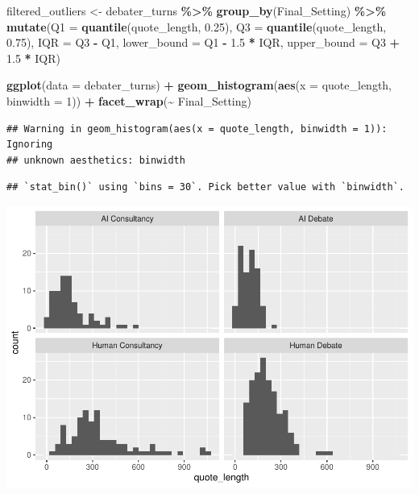 \documentclass[
]{article}
\newenvironment{Shaded}{\begin{snugshade}}{\end{snugshade}}
\newcommand{\AttributeTok}[1]{\textcolor[rgb]{0.13,0.29,0.53}{#1}}
\newcommand{\DecValTok}[1]{\textcolor[rgb]{0.00,0.00,0.81}{#1}}
\newcommand{\FloatTok}[1]{\textcolor[rgb]{0.00,0.00,0.81}{#1}}
\newcommand{\FunctionTok}[1]{\textcolor[rgb]{0.13,0.29,0.53}{\textbf{#1}}}
\newcommand{\NormalTok}[1]{#1}
\newcommand{\OtherTok}[1]{\textcolor[rgb]{0.56,0.35,0.01}{#1}}
\newcommand{\SpecialCharTok}[1]{\textcolor[rgb]{0.81,0.36,0.00}{\textbf{#1}}}
\begin{document}
\begin{Shaded}
\begin{Highlighting}[]
\NormalTok{filtered\_outliers }\OtherTok{\textless{}{-}}\NormalTok{ debater\_turns }\SpecialCharTok{\%\textgreater{}\%}
  \FunctionTok{group\_by}\NormalTok{(Final\_Setting) }\SpecialCharTok{\%\textgreater{}\%}
  \FunctionTok{mutate}\NormalTok{(}\AttributeTok{Q1 =} \FunctionTok{quantile}\NormalTok{(quote\_length, }\FloatTok{0.25}\NormalTok{),}
         \AttributeTok{Q3 =} \FunctionTok{quantile}\NormalTok{(quote\_length, }\FloatTok{0.75}\NormalTok{),}
         \AttributeTok{IQR =}\NormalTok{ Q3 }\SpecialCharTok{{-}}\NormalTok{ Q1,}
         \AttributeTok{lower\_bound =}\NormalTok{ Q1 }\SpecialCharTok{{-}} \FloatTok{1.5} \SpecialCharTok{*}\NormalTok{ IQR,}
         \AttributeTok{upper\_bound =}\NormalTok{ Q3 }\SpecialCharTok{+} \FloatTok{1.5} \SpecialCharTok{*}\NormalTok{ IQR)}

\FunctionTok{ggplot}\NormalTok{(}\AttributeTok{data =}\NormalTok{ debater\_turns) }\SpecialCharTok{+}
  \FunctionTok{geom\_histogram}\NormalTok{(}\FunctionTok{aes}\NormalTok{(}\AttributeTok{x =}\NormalTok{ quote\_length, }\AttributeTok{binwidth =} \DecValTok{1}\NormalTok{)) }\SpecialCharTok{+}
  \FunctionTok{facet\_wrap}\NormalTok{(}\SpecialCharTok{\textasciitilde{}}\NormalTok{ Final\_Setting)}
\end{Highlighting}
\end{Shaded}

\begin{verbatim}
## Warning in geom_histogram(aes(x = quote_length, binwidth = 1)): Ignoring
## unknown aesthetics: binwidth
\end{verbatim}

\begin{verbatim}
## `stat_bin()` using `bins = 30`. Pick better value with `binwidth`.
\end{verbatim}

\includegraphics[width=1\linewidth]{debate-2309_files/figure-latex/quote_length graph-2}
\end{document}
